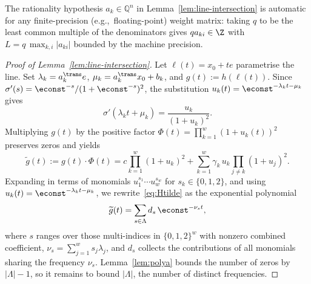 \begin{remark}\label{rem:commensurability-sufficient}
    The rationality hypothesis $a_k\in \mathbb{Q}^n$ in Lemma~\ref{lem:line-intersection} is automatic for any finite-precision (e.g.,\ floating-point) weight matrix: taking $q$ to be the least common multiple of the denominators gives $q a_{ki}\in\Z$ with $L = q\,\max_{k,i}|a_{ki}|$ bounded by the machine precision.
    \end{remark}

\begin{proof}[Proof of Lemma~\ref{lem:line-intersection}]
Let $\ell(t) = x_0 + te$ parametrise the line. Set $\lambda_k = a_k^{\trans} e$, $\mu_k = a_k^{\trans} x_0 + b_k$, and $g(t) := h(\ell(t))$. Since $\sigma'(s) = \econst^{-s}/(1+\econst^{-s})^2$, the substitution $u_k(t) = \econst^{-\lambda_k t - \mu_k}$ gives
\begin{equation*}
  \sigma'(\lambda_k t + \mu_k) = \frac{u_k}{(1+u_k)^2}.
\end{equation*}
Multiplying $g(t)$ by the positive factor $\Phi(t) = \prod_{k=1}^w (1+u_k(t))^2$ preserves zeros and yields
\begin{equation}\label{eq:Htilde}
  \widetilde{g}(t) := g(t)\cdot \Phi(t) = c\prod_{k=1}^w (1+u_k)^2 + \sum_{k=1}^w \gamma_k\, u_k\prod_{j\neq k}(1+u_j)^2.
\end{equation}
Expanding in terms of monomials $u_1^{s_1}\cdots u_w^{s_w}$ for $s_k\in \{0,1,2\}$, and using $u_k(t) = \econst^{-\lambda_k t - \mu_k}$, we rewrite~\eqref{eq:Htilde} as the exponential polynomial
\begin{equation}\label{eq:gen-exp-poly}
  \widetilde{g}(t) = \sum_{s \in \Lambda} d_{s}\, \econst^{-\nu_{s} t},
\end{equation}
where $s$ ranges over those multi-indices in $\{0,1,2\}^w$ with nonzero combined coefficient, $\nu_s = \sum_{j=1}^w s_j \lambda_j$, and $d_s$ collects the contributions of all monomials sharing the frequency $\nu_s$. Lemma~\ref{lem:polya} bounds the number of zeros by $|\Lambda| - 1$, so it remains to bound $|\Lambda|$, the number of distinct frequencies.


\end{proof}
